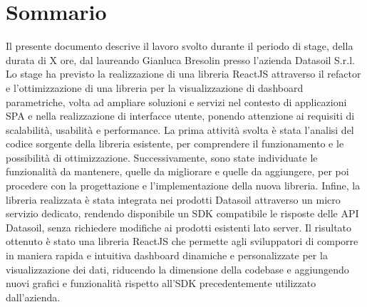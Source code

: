 \cleardoublepage
{}
{}
\begingroup
\let\clearpage\relax
\let\cleardoublepage\relax
\chapter*{Sommario}

Il presente documento descrive il lavoro svolto durante il periodo di stage, della durata di X ore, dal laureando Gianluca Bresolin
presso l'azienda Datasoil S.r.l. Lo stage ha previsto la realizzazione di una libreria ReactJS attraverso il refactor
e l'ottimizzazione di una libreria per la visualizzazione di dashboard parametriche, volta ad ampliare soluzioni e servizi 
nel contesto di applicazioni SPA e nella realizzazione di interfacce utente, ponendo attenzione ai requisiti di scalabilità,
usabilità e performance. \newline
La prima attività svolta è stata l'analisi del codice sorgente della libreria esistente, per comprendere il funzionamento e le possibilità
di ottimizzazione. Successivamente, sono state individuate le funzionalità da mantenere, quelle da migliorare e quelle da aggiungere,
per poi procedere con la progettazione e l'implementazione della nuova libreria. \newline
Infine, la libreria realizzata è stata integrata nei prodotti Datasoil attraverso un micro servizio dedicato, rendendo disponibile un SDK
compatibile le risposte delle API Datasoil, senza richiedere modifiche ai prodotti esistenti lato server. \newline
Il risultato ottenuto è stato una libreria ReactJS che permette agli sviluppatori di comporre in maniera rapida e intuitiva dashboard
dinamiche e personalizzate per la visualizzazione dei dati, riducendo la dimensione della codebase e aggiungendo nuovi grafici e funzionalità
rispetto all'SDK precedentemente utilizzato dall'azienda.


\endgroup
\vfill
